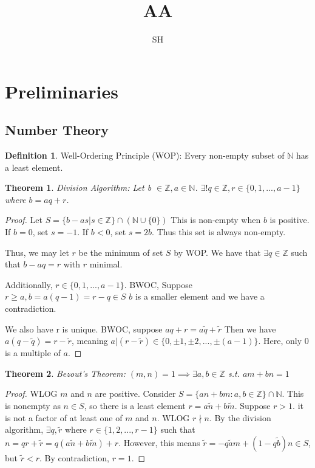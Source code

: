 \documentclass{article}
\title{AA}
\author{SH}
\theoremstyle{definition}
\newtheorem{definition}{Definition}
\theoremstyle{plain}
\newtheorem{theorem}{Theorem}
\theoremstyle{corollary}
\theoremstyle{lemma}
\begin{document}
\maketitle

\section{Preliminaries}

\subsection{Number Theory}

\begin{definition}
Well-Ordering Principle (WOP): Every non-empty subset of $\mathbb{N}$ has a least element.
\end{definition}

\begin{theorem}
Division Algorithm: Let b $\in\mathbb{Z}, a\in\mathbb{N}$. $\exists! q\in\mathbb{Z}, r\in\{0,1,...,a-1\}$ where $b = aq + r$.
\end{theorem}

\begin{proof}
Let $S = \{b-as|s\in\mathbb{Z}\}\cap(\mathbb{N}\cup\{0\})$
This is non-empty when $b$ is positive. If $b=0$, set $s=-1$. If $b<0$, set $s=2b$. Thus this set is always non-empty.

Thus, we may let $r$ be the minimum of set $S$ by WOP. We have that $\exists q\in\mathbb{Z}$ such that $b-aq=r$ with $r$ minimal.

Additionally, $r\in\{0,1,...,a-1\}$. BWOC, Suppose $r\geq a, b=a(q-1)=r-q\in S$ $b$ is a smaller element and we have a contradiction.

We also have r is unique. BWOC, suppose $aq+r=a\tilde{q}+\tilde{r}$ Then we have $a(q-\tilde{q})=r-\tilde{r}$, meaning $a|(r-\tilde{r})\in\{0,\pm1,\pm2,...,\pm(a-1)\}$. Here, only $0$ is a multiple of $a$.
\end{proof}

\begin{theorem}
Bezout's Theorem: $(m,n)=1\implies\exists a,b\in\mathbb{Z}$ s.t. $am+bn=1$
\end{theorem}

\begin{proof}
WLOG $m$ and $n$ are positive. Consider $S = \{an+bm:a,b\in\mathbb{Z}\}\cap\mathbb{N}$. This is nonempty as $n\in S$, so there is a least element $r=a\tilde{n}+b\tilde{m}$.
Suppose $r>1$. it is not a factor of at least one of $m$ and $n$.
WLOG $r\nmid n$. By the division algorithm, $\exists q,\tilde{r}$ where $r\in \{1,2,...,r-1\}$ such that $n=qr+\tilde{r}=q(a\tilde{n}+b\tilde{m})+r$. However, this means $\tilde{r}=-q\tilde{a}m+(1-q\tilde{b})n\in S$, but $\tilde{r}<r$. By contradiction, $r=1$.
\end{proof}
\end{document}
